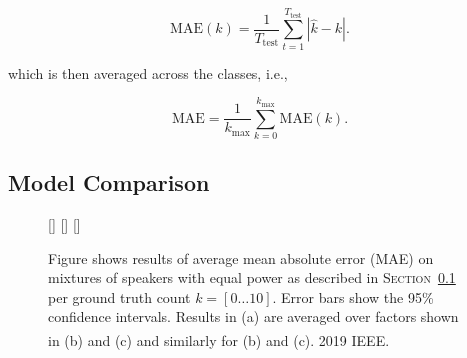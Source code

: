 \begin{equation}
  \mbox{MAE}(k) = \frac{1}{T_{\textrm{test}}} \sum_{t=1}^{T_\textrm{test}}\left| \hat{k} - k \right|.
\end{equation}

which is then averaged across the classes, i.e.,

\begin{equation}
  \mbox{MAE} = \frac{1}{k_{\max}} \sum_{k=0}^{k_{\max}} \mbox{MAE}(k).
\end{equation}


\subsection{Model Comparison}%
\label{ssec:model_comparsion}

\begin{figure}
\centering
{}
[\textwidth]{}%
\hspace{0.2\textwidth} %
[\textwidth]{}%
\hspace{0.2\textwidth} %
[\textwidth]{}%
\caption[Short Caption]{Figure shows results of average mean absolute error (MAE) on mixtures of speakers with equal power as described in \textsc{Section~\ref{ssec:model_comparsion}} per ground truth count \(k=[0\ldots10]\). Error bars show the 95\% confidence intervals. Results in (a) are averaged over factors shown in (b) and (c) and similarly for (b) and (c). \textsuperscript{\textregistered}2019 IEEE.}
\label{fig:fixed-gain-results}
\end{figure}

